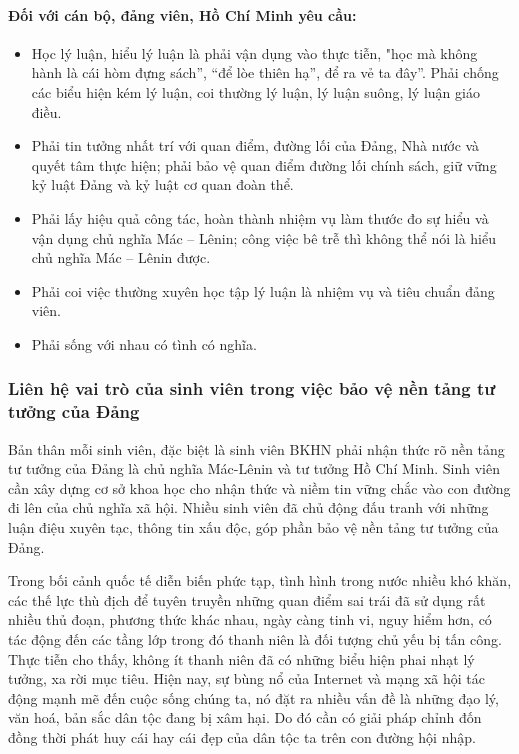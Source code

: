 \paragraph{Đối với cán bộ, đảng viên, Hồ Chí Minh yêu cầu:}
\begin{itemize}
    \item Học lý luận, hiểu lý luận là phải vận dụng vào thực tiễn, "học mà không hành là cái hòm đựng sách'', ``để lòe thiên hạ'', để ra vẻ ta đây''. Phải chống các biểu hiện kém lý luận, coi thường lý luận, lý luận suông, lý luận giáo điều.
    \item Phải tin tưởng nhất trí với quan điểm, đường lối của Đảng, Nhà nước và quyết tâm thực hiện; phải bảo vệ quan điểm đường lối chính sách, giữ vững kỷ luật Đảng và kỷ luật cơ quan đoàn thể.
    \item Phải lấy hiệu quả công tác, hoàn thành nhiệm vụ làm thước đo sự hiểu và vận dụng chủ nghĩa Mác – Lênin; công việc bê trễ thì không thể nói là hiểu chủ nghĩa Mác – Lênin được.
    \item Phải coi việc thường xuyên học tập lý luận là nhiệm vụ và tiêu chuẩn đảng viên.
    \item Phải sống với nhau có tình có nghĩa.
\end{itemize}

\subsubsection{Liên hệ vai trò của sinh viên trong việc bảo vệ nền tảng tư tưởng của Đảng}

Bản thân mỗi sinh viên, đặc biệt là sinh viên BKHN phải nhận thức rõ nền tảng tư tưởng của Đảng là chủ nghĩa Mác-Lênin và tư tưởng Hồ Chí Minh. Sinh viên cần xây dựng cơ sở khoa học cho nhận thức và niềm tin vững chắc vào con đường đi lên của chủ nghĩa xã hội. Nhiều sinh viên đã chủ động đấu tranh với những luận điệu xuyên tạc, thông tin xấu độc, góp phần bảo vệ nền tảng tư tưởng của Đảng.

Trong bối cảnh quốc tế diễn biến phức tạp, tình hình trong nước nhiều khó khăn, các thế lực thù địch để tuyên truyền những quan điểm sai trái đã sử dụng rất nhiều thủ đoạn, phương thức khác nhau, ngày càng tinh vi, nguy hiểm hơn, có tác động đến các tầng lớp trong đó thanh niên là đối tượng chủ yếu bị tấn công. Thực tiễn cho thấy, không ít thanh niên đã có những biểu hiện phai nhạt lý tưởng, xa rời mục tiêu. Hiện nay, sự bùng nổ của Internet và mạng xã hội tác động mạnh mẽ đến cuộc sống chúng ta, nó đặt ra nhiều vấn đề là những đạo lý, văn hoá, bản sắc dân tộc đang bị xâm hại. Do đó cần có giải pháp chỉnh đốn đồng thời phát huy cái hay cái đẹp của dân tộc ta trên con đường hội nhập.

